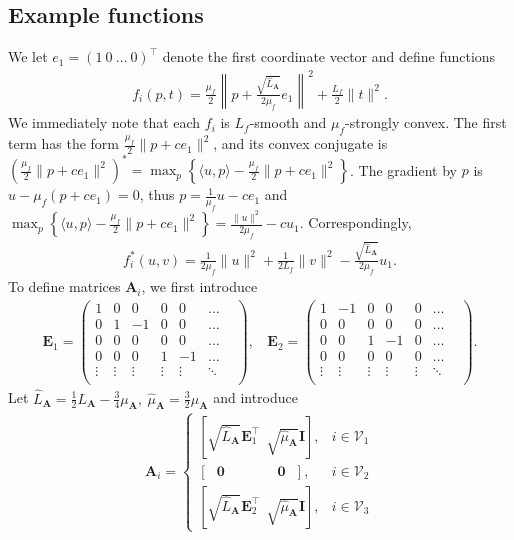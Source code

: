 \documentclass{article}
\def\<#1,#2>{\langle #1,#2\rangle}
\newcommand{\norm}[1]{\|#1\|}
\newcommand{\sqn}[1]{\norm{#1}^2}
\newcommand{\cV}{\mathcal{V}}
\newcommand{\mA}{\mathbf{A}}
\newcommand{\mI}{\mathbf{I}}
\newcommand{\mE}{\mathbf{E}}
\newcommand{\cbr}[1]{\left( #1 \right)}
\newcommand{\braces}[1]{\left\{ #1 \right\}}
\begin{document}
\subsection{Example functions}
We let $e_1 = (1~ 0~ \ldots~ 0)^\top$ denote the first coordinate vector and define functions
\begin{align}\label{eq:lower_bound_functions_f}
	f_i(p, t) = \frac{\mu_f}{2} \left\|p + \frac{\sqrt{\hat L_\mA}}{2\mu_f}e_1\right\|^2 + \frac{L_f}{2} \sqn{t}.
\end{align}
We immediately note that each $f_i$ is $L_f$-smooth and $\mu_f$-strongly convex. The first term has the form $\frac {\mu_f}2 \sqn{p + c e_1}$, and its convex conjugate is
$\cbr{\frac{\mu_f}2 \sqn{p + c e_1}}^* = \max_p \braces{\<u, p> - \frac{\mu_f}{2}\sqn{p + c e_1}}$. 
The gradient by $p$ is $u - \mu_f(p + c e_1) = 0$, thus 
$p = \frac{1}{\mu_f} u - c e_1$ and 
$\max_p \braces{\<u, p> - \frac{\mu_f}{2}\sqn{p + c e_1}} = \frac{\sqn u}{2 \mu_f} - cu_1$.
Correspondingly,
\begin{align*}
	f_i^*(u, v) = \frac{1}{2\mu_f} \sqn{u} + \frac{1}{2L_f} \sqn{v} - \frac{\sqrt{\hat L_\mA}}{2\mu_f}u_1.
\end{align*}
To define matrices $\mA_i$, we first introduce
\begin{align*}
	\mE_1 = \begin{pmatrix}
		1 & 0 & 0 & 0 & 0 & \ldots & \\
		0 & 1 & -1 & 0 & 0 & \ldots & \\
		0 & 0 & 0 & 0 & 0 & \ldots & \\
		0 & 0 & 0 & 1 & -1 & \ldots & \\
		\vdots & \vdots & \vdots & \vdots & \vdots & \ddots \\		
	\end{pmatrix},~~~~
	\mE_2 = \begin{pmatrix}
		1 & -1 & 0 & 0 & 0 & \ldots & \\
		0 & 0 & 0 & 0 & 0 & \ldots & \\
		0 & 0 & 1 & -1 & 0 & \ldots & \\
		0 & 0 & 0 & 0 & 0 & \ldots & \\
		\vdots & \vdots & \vdots & \vdots & \vdots & \ddots & \\		
	\end{pmatrix}.
\end{align*}
Let $\hat L_\mA = \frac{1}{2} L_\mA - \frac{3}{4} \mu_\mA,~ \hat\mu_\mA = \frac{3}{2}\mu_\mA$ and introduce
\begin{align*}
	\mA_i = \begin{cases}
		[\sqrt{\hat L_\mA} \mE_1^\top ~~ \sqrt{\hat\mu_\mA} \mI], &i\in\cV_1 \\
		[~~~\mathbf{0}~~~~~~~~~~~~~~~~~  \mathbf{0}~~~],  &i\in\cV_2 \\
		[\sqrt{\hat L_\mA} \mE_2^\top ~~ \sqrt{\hat\mu_\mA} \mI], &i\in\cV_3
	\end{cases}
\end{align*}
\end{document}
